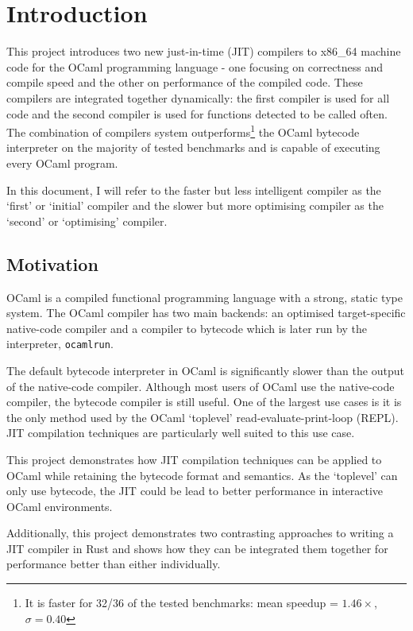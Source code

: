 \chapter{Introduction}

This project introduces two new just-in-time (JIT) compilers to x86\_64 machine code for the OCaml
programming language - one focusing on correctness and compile speed and the other on performance
of the compiled code. These compilers are integrated together dynamically: the first compiler is
used for all code and the second compiler is used for functions detected to be called often.  The
combination of compilers system outperforms\footnote{It is faster for 32/36 of the tested
      benchmarks: mean speedup = $1.46\times$, $\sigma = 0.40$} the
OCaml bytecode interpreter on the majority of tested benchmarks and is capable of executing every
OCaml program.

In this document, I will refer to the faster but less intelligent compiler as the `first' or
`initial' compiler and the slower but more optimising compiler as the `second' or `optimising'
compiler.

\section{Motivation}

OCaml is a compiled functional programming language with a strong, static type system. The OCaml
compiler has two main backends: an optimised target-specific native-code compiler and a compiler to
bytecode which is later run by the interpreter, \texttt{ocamlrun}.

The default bytecode interpreter in OCaml is significantly slower than the output of the
native-code compiler. Although most users of OCaml use the native-code compiler, the bytecode
compiler is
still useful. One of the largest use cases is it is the only method used by the OCaml `toplevel'
read-evaluate-print-loop (REPL). JIT compilation techniques are particularly well suited to this
use case.

This project demonstrates how JIT compilation techniques can be applied to OCaml while retaining
the bytecode format and semantics. As the `toplevel' can only use
bytecode, the JIT could be lead to better performance in interactive OCaml environments.

Additionally, this project demonstrates two contrasting approaches to writing a JIT compiler in
Rust and shows how they can be integrated them together for performance better than either
individually.

